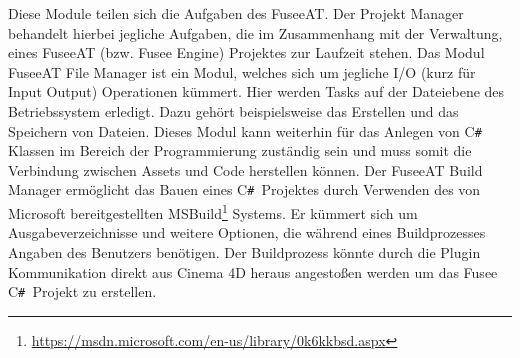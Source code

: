 \documentclass[pagesize, paper=a4, fontsize=12pt, titlepage=true, headings=small, headnosepline, abstractoff, liststotoc, nochapterprefix, plainheadsepline, twoside]{scrreprt}
\newcommand{\CSS}{C\texttt{\# }}
\begin{document}
Diese Module teilen sich die Aufgaben des FuseeAT. Der Projekt Manager behandelt hierbei jegliche Aufgaben, die im Zusammenhang mit der Verwaltung, eines FuseeAT (bzw. Fusee Engine) Projektes zur Laufzeit stehen.
Das Modul FuseeAT File Manager ist ein Modul, welches sich um jegliche I/O (kurz für Input Output) Operationen kümmert. Hier werden Tasks auf der Dateiebene des Betriebssystem erledigt. Dazu gehört beispielsweise das Erstellen und das Speichern von Dateien. Dieses Modul kann weiterhin für das Anlegen von \CSS Klassen im Bereich der Programmierung zuständig sein und muss somit die Verbindung zwischen Assets und Code herstellen können.
Der FuseeAT Build Manager ermöglicht das Bauen eines \CSS Projektes durch Verwenden des von Microsoft bereitgestellten MSBuild\footnote{\url{https://msdn.microsoft.com/en-us/library/0k6kkbsd.aspx}} Systems. Er kümmert sich um Ausgabeverzeichnisse und weitere Optionen, die während eines Buildprozesses Angaben des Benutzers benötigen. Der Buildprozess könnte durch die Plugin Kommunikation direkt aus Cinema 4D heraus angestoßen werden um das Fusee \CSS Projekt zu erstellen.
\end{document}

